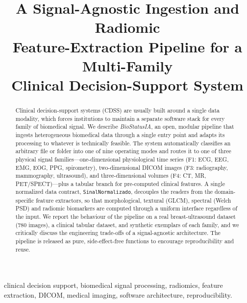 \documentclass[conference]{IEEEtran}
\begin{document}
\title{A Signal-Agnostic Ingestion and Radiomic\\ Feature-Extraction Pipeline for a Multi-Family\\ Clinical Decision-Support System}

\author{
}

\maketitle

\begin{abstract}
Clinical decision-support systems (CDSS) are usually built around a single
data modality, which forces institutions to maintain a separate software
stack for every family of biomedical signal. We describe \emph{BioStatusIA},
an open, modular pipeline that ingests heterogeneous biomedical data through a
single entry point and adapts its processing to whatever is technically
feasible. The system automatically classifies an arbitrary file or folder into
one of nine operating modes and routes it to one of three physical signal
families---one-dimensional physiological time series (F1: ECG, EEG, EMG, EOG,
PPG, spirometry), two-dimensional DICOM images (F3: radiography, mammography,
ultrasound), and three-dimensional volumes (F4: CT, MR, PET/SPECT)---plus a
tabular branch for pre-computed clinical features. A single normalized data
contract, \texttt{SinalNormalizado}, decouples the readers from the
domain-specific feature extractors, so that morphological, textural (GLCM),
spectral (Welch PSD) and radiomic biomarkers are computed through a uniform
interface regardless of the input. We report the behaviour of the pipeline on
a real breast-ultrasound dataset (780 images), a clinical tabular dataset, and
synthetic exemplars of each family, and we critically discuss the engineering
trade-offs of a signal-agnostic architecture. The pipeline is released as pure,
side-effect-free functions to encourage reproducibility and reuse.
\end{abstract}

\begin{IEEEkeywords}
clinical decision support, biomedical signal processing, radiomics, feature
extraction, DICOM, medical imaging, software architecture, reproducibility.
\end{IEEEkeywords}
\end{document}
